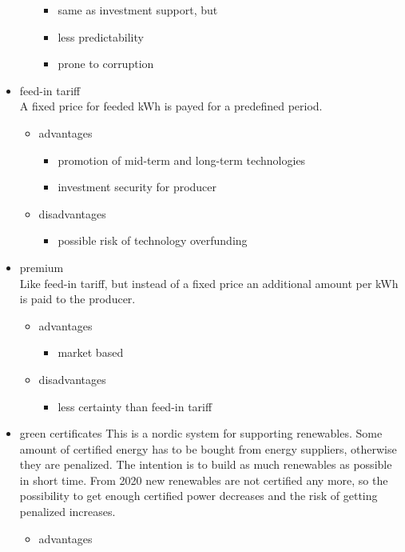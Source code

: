 \documentclass{article}
\begin{document}
\begin{itemize}
\begin{itemize}
\begin{itemize}
\item same as investment support, but
\item less predictability
\item prone to corruption
\end{itemize}
\end{itemize}
\item feed-in tariff\\
A fixed price for feeded kWh is payed for a predefined period.
\begin{itemize}
\item advantages
\begin{itemize}
\item promotion of mid-term and long-term technologies
\item investment security for producer
\end{itemize}
\item disadvantages
\begin{itemize}
\item possible risk of technology overfunding
\end{itemize}
\end{itemize}
\item premium\\
Like feed-in tariff, but instead of a fixed price an additional amount per kWh is paid to the producer.
\begin{itemize}
\item advantages
\begin{itemize}
\item market based
\end{itemize}
\item disadvantages
\begin{itemize}
\item less certainty than feed-in tariff
\end{itemize}
\end{itemize}
\item green certificates
This is a nordic system for supporting renewables. Some amount of certified energy has to be bought from energy suppliers, otherwise they are penalized. The intention is to build as much renewables as possible in short time. From 2020 new renewables are not certified any more, so the possibility to get enough certified power decreases and the risk of getting penalized increases.
\begin{itemize}
\item advantages
\begin{itemize}

\end{itemize}
\end{itemize}
\end{itemize}
\end{document}
